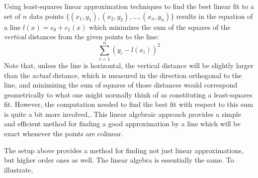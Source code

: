 \documentclass{ximera}
\begin{document}
\begin{remark} Using least-squares linear approximation techniques to find the best linear fit to a set of $n$ data points $\{(x_1,y_1), (x_2,y_2),\dots,(x_n,y_n)\}$ results in the equation of a line $l(x) = c_0 + c_1(x)$ which minimizes the sum of the squares of the {\it vertical} distances from the given points to the line:
\[
\sum_{i=1}^n (y_i - l(x_i))^2
\]
Note that, unless the line is horizontal, the vertical distance will be slightly larger than the {\it actual} distance, which is measured in the direction orthogonal to the line, and minimizing the sum of squares of those distances would correspond geometrically to what one might normally think of as constituting a least-squares fit. However, the computation needed to find the best fit with respect to this sum is quite a bit more involved,. This linear algebraic approach provides a simple and efficient method for finding a good approximation by a line which will be exact whenever the points are colinear.
\end{remark}

The setup above provides a method for finding not just linear approximations, but higher order ones as well. The linear algebra is essentially the same. To illustrate,
\end{document}
